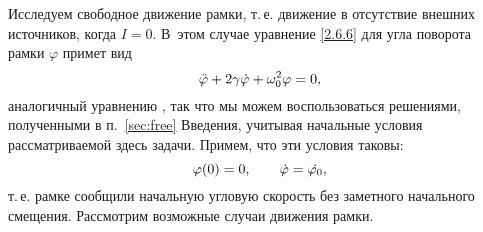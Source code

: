 Исследуем свободное движение рамки, т.\,е. движение в отсутствие внешних 
источников, когда $I = 0$. В~этом случае уравнение \eqref{2.6.6} для 
угла поворота рамки $\varphi$ примет вид
\begin{equation}
	\eqmark{2.6.9}
	\ddot{\varphi} + 2\gamma \dot{\varphi} + \omega^2_{0}\varphi = 0,
\end{equation}
аналогичный уравнению , так что мы можем воспользоваться решениями,
полученными в п.~\ref{sec:free} Введения, учитывая начальные
условия рассматриваемой здесь задачи. Примем, что эти условия таковы:
\begin{equation}
	\eqmark{2.6.10}
	 \varphi(0) = 0, \qquad \dot{\varphi} = \dot{\varphi_0},
\end{equation}
т.\,е. рамке сообщили начальную угловую скорость без заметного начального смещения. 
Рассмотрим возможные случаи движения рамки.
